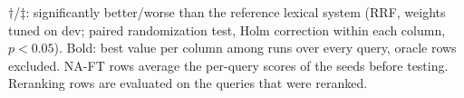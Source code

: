\begin{table}[t]
\vspace{2pt}
\parbox{\textwidth}{\footnotesize $\dagger$/$\ddagger$: significantly better/worse than the reference lexical system (RRF, weights tuned on dev; paired randomization test, Holm correction within each column, $p<0.05$). Bold: best value per column among runs over every query, oracle rows excluded. NA-FT rows average the per-query scores of the seeds before testing. Reranking rows are evaluated on the queries that were reranked.}
\end{table}
